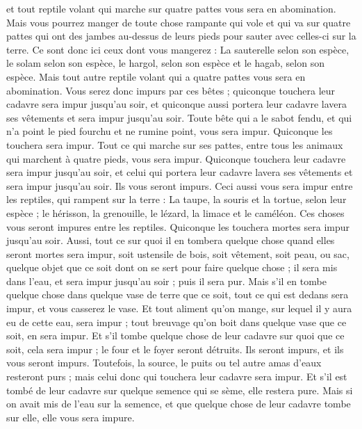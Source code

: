 \begin{multicols}{2}
et tout reptile volant qui marche sur quatre pattes vous sera en abomination.
Mais vous pourrez manger de toute chose rampante qui vole et qui va sur quatre pattes qui ont des jambes au-dessus de leurs pieds pour sauter avec celles-ci sur la terre.
Ce sont donc ici ceux dont vous mangerez : La sauterelle selon son espèce, le solam selon son espèce, le hargol, selon son espèce et le hagab, selon son espèce.
Mais tout autre reptile volant qui a quatre pattes vous sera en abomination.
Vous serez donc impurs par ces bêtes ; quiconque touchera leur cadavre sera impur jusqu'au soir,
et quiconque aussi portera leur cadavre lavera ses vêtements et sera impur jusqu'au soir.
Toute bête qui a le sabot fendu, et qui n'a point le pied fourchu et ne rumine point, vous sera impur. Quiconque les touchera sera impur.
Tout ce qui marche sur ses pattes, entre tous les animaux qui marchent à quatre pieds, vous sera impur. Quiconque touchera leur cadavre sera impur jusqu'au soir,
et celui qui portera leur cadavre lavera ses vêtements et sera impur jusqu'au soir. Ils vous seront impurs.
Ceci aussi vous sera impur entre les reptiles, qui rampent sur la terre : La taupe, la souris et la tortue, selon leur espèce ;
le hérisson, la grenouille, le lézard, la limace et le caméléon.
Ces choses vous seront impures entre les reptiles. Quiconque les touchera mortes sera impur jusqu'au soir.
Aussi, tout ce sur quoi il en tombera quelque chose quand elles seront mortes sera impur, soit ustensile de bois, soit vêtement, soit peau, ou sac, quelque objet que ce soit dont on se sert pour faire quelque chose ; il sera mis dans l'eau, et sera impur jusqu'au soir ; puis il sera pur.
Mais s'il en tombe quelque chose dans quelque vase de terre que ce soit, tout ce qui est dedans sera impur, et vous casserez le vase.
Et tout aliment qu'on mange, sur lequel il y aura eu de cette eau, sera impur ; tout breuvage qu'on boit dans quelque vase que ce soit, en sera impur.
Et s'il tombe quelque chose de leur cadavre sur quoi que ce soit, cela sera impur ; le four et le foyer seront détruits. Ils seront impurs, et ils vous seront impurs.
Toutefois, la source, le puits ou tel autre amas d'eaux resteront purs ; mais celui donc qui touchera leur cadavre sera impur.
Et s'il est tombé de leur cadavre sur quelque semence qui se sème, elle restera pure.
Mais si on avait mis de l'eau sur la semence, et que quelque chose de leur cadavre tombe sur elle, elle vous sera impure.

\end{multicols}
